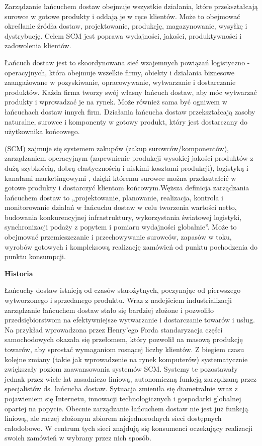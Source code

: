 Zarządzanie łańcuchem dostaw obejmuje wszystkie działania, które przekształcają surowce w gotowe produkty i oddają je w ręce klientów. Może to obejmować określanie źródła dostaw, projektowanie, produkcję, magazynowanie, wysyłkę i dystrybucję. Celem SCM jest poprawa wydajności, jakości, produktywności i zadowolenia klientów. \cite{scm2023}

Łańcuch dostaw jest to skoordynowana sieć wzajemnych powiązań logistyczno - operacyjnych, która obejmuje wszelkie firmy, obiekty i działania biznesowe zaangażowane w pozyskiwanie, opracowywanie, wytwarzanie i dostarczanie produktów.
Każda firma tworzy swój własny łańcuch dostaw, aby móc wytwarzać produkty i wprowadzać je na rynek. Może również sama być ogniwem w łańcuchach dostaw innych firm. Działania łańcucha dostaw przekształcają zasoby naturalne, surowce i komponenty w gotowy produkt, który jest dostarczany do użytkownika końcowego. \cite{wdx2023}

 (SCM) zajmuje się systemem zakupów (zakup surowców/komponentów), zarządzaniem operacyjnym (zapewnienie produkcji wysokiej jakości produktów z dużą szybkością, dobrą elastycznością i niskimi kosztami produkcji), logistyką i kanałami marketingowymi , dzięki któremu surowce można przekształcić w gotowe produkty i dostarczyć klientom końcowym.Węższa definicja zarządzania łańcuchem dostaw to „projektowanie, planowanie, realizacja, kontrola i monitorowanie działań w łańcuchu dostaw w celu tworzenia wartości netto, budowania konkurencyjnej infrastruktury, wykorzystania światowej logistyki, synchronizacji podaży z popytem i pomiaru wydajności globalnie”. Może to obejmować przemieszczanie i przechowywanie surowców, zapasów w toku, wyrobów gotowych i kompleksową realizację zamówień od punktu pochodzenia do punktu konsumpcji. \cite{wiken2023}

\vspace{\baselineskip}
\textbf{Historia}

Łańcuchy dostaw istnieją od czasów starożytnych, poczynając od pierwszego wytworzonego i sprzedanego produktu. Wraz z nadejściem industrializacji zarządzanie łańcuchem dostaw stało się bardziej złożone i pozwoliło przedsiębiorstwom na efektywniejsze wytwarzanie i dostarczanie towarów i usług. Na przykład wprowadzona przez Henry'ego Forda standaryzacja części samochodowych okazała się przełomem, który pozwolił na masową produkcję towarów, aby sprostać wymaganiom rosnącej liczby klientów. Z biegiem czasu kolejne zmiany (takie jak wprowadzenie na rynek komputerów) systematycznie zwiększały poziom zaawansowania systemów SCM. Systemy te pozostawały jednak przez wiele lat zasadniczo liniową, autonomiczną funkcją zarządzaną przez specjalistów ds. łańcucha dostaw. 
Sytuacja zmieniła się diametralnie wraz z pojawieniem się Internetu, innowacji technologicznych i gospodarki globalnej opartej na popycie. Obecnie zarządzanie łańcuchem dostaw nie jest już funkcją liniową, ale raczej złożonym zbiorem niejednorodnych sieci dostępnych całodobowo. W centrum tych sieci znajdują się konsumenci oczekujący realizacji swoich zamówień w wybrany przez nich sposób.\cite{oracle2023}

